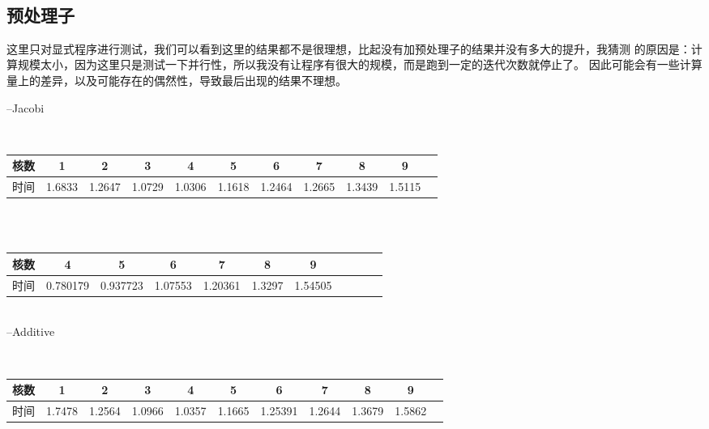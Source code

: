 \documentclass[10pt, a4paper]{article}
\begin{document}
~\\



\subsection{预处理子}

这里只对显式程序进行测试，我们可以看到这里的结果都不是很理想，比起没有加预处理子的结果并没有多大的提升，我猜测
的原因是：计算规模太小，因为这里只是测试一下并行性，所以我没有让程序有很大的规模，而是跑到一定的迭代次数就停止了。
因此可能会有一些计算量上的差异，以及可能存在的偶然性，导致最后出现的结果不理想。

--Jacobi

~\\

\begin{tabular}{|c|c|c|c|c|c|c|c|c|c|c|}%
\hline  %
核数&1&2&3&4&5&6&7&8&9\\
\hline  %
时间&1.6833&1.2647&1.0729&1.0306&1.1618&1.2464&1.2665&1.3439&1.5115\\
\hline %
\end{tabular}

~\\

~\\

\begin{tabular}{|c|c|c|c|c|c|c|c|c|c|c|}%
\hline  %
核数&4&5&6&7&8&9\\
\hline  %
时间&0.780179&0.937723&1.07553&1.20361&1.3297&1.54505\\
\hline %
\end{tabular}

~\\

--Additive 

~\\

\begin{tabular}{|c|c|c|c|c|c|c|c|c|c|c|}%
\hline  %
核数&1&2&3&4&5&6&7&8&9\\
\hline  %
时间&1.7478&1.2564&1.0966&1.0357&1.1665&1.25391&1.2644&1.3679&1.5862\\
\hline %
\end{tabular}
\end{document}
